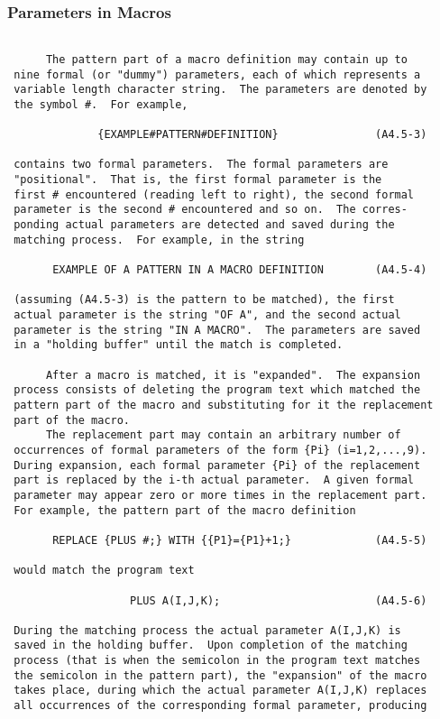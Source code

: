  \subsubsection{Parameters in Macros}
 \begin{verbatim}

      The pattern part of a macro definition may contain up to
 nine formal (or "dummy") parameters, each of which represents a
 variable length character string.  The parameters are denoted by
 the symbol #.  For example,

              {EXAMPLE#PATTERN#DEFINITION}               (A4.5-3)

 contains two formal parameters.  The formal parameters are
 "positional".  That is, the first formal parameter is the
 first # encountered (reading left to right), the second formal
 parameter is the second # encountered and so on.  The corres-
 ponding actual parameters are detected and saved during the
 matching process.  For example, in the string

       EXAMPLE OF A PATTERN IN A MACRO DEFINITION        (A4.5-4)

 (assuming (A4.5-3) is the pattern to be matched), the first
 actual parameter is the string "OF A", and the second actual
 parameter is the string "IN A MACRO".  The parameters are saved
 in a "holding buffer" until the match is completed.

      After a macro is matched, it is "expanded".  The expansion
 process consists of deleting the program text which matched the
 pattern part of the macro and substituting for it the replacement
 part of the macro.
      The replacement part may contain an arbitrary number of
 occurrences of formal parameters of the form {Pi} (i=1,2,...,9).
 During expansion, each formal parameter {Pi} of the replacement
 part is replaced by the i-th actual parameter.  A given formal
 parameter may appear zero or more times in the replacement part.
 For example, the pattern part of the macro definition

       REPLACE {PLUS #;} WITH {{P1}={P1}+1;}             (A4.5-5)

 would match the program text

                   PLUS A(I,J,K);                        (A4.5-6)

 During the matching process the actual parameter A(I,J,K) is
 saved in the holding buffer.  Upon completion of the matching
 process (that is when the semicolon in the program text matches
 the semicolon in the pattern part), the "expansion" of the macro
 takes place, during which the actual parameter A(I,J,K) replaces
 all occurrences of the corresponding formal parameter, producing


\end{verbatim}
